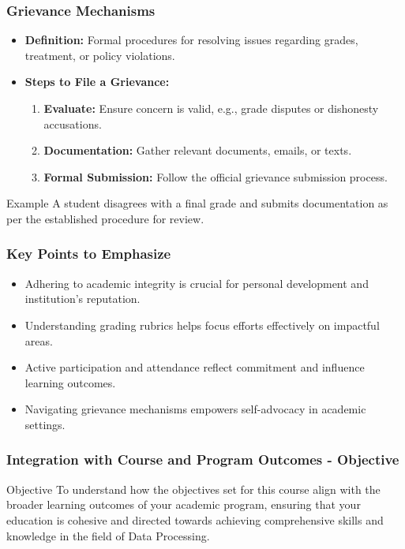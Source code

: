 \documentclass[aspectratio=169]{beamer}
\begin{document}
\begin{frame}[fragile]
    \frametitle{Grievance Mechanisms}
    \begin{itemize}
        \item \textbf{Definition:} Formal procedures for resolving issues regarding grades, treatment, or policy violations.
        \item \textbf{Steps to File a Grievance:}
        \begin{enumerate}
            \item \textbf{Evaluate:} Ensure concern is valid, e.g., grade disputes or dishonesty accusations.
            \item \textbf{Documentation:} Gather relevant documents, emails, or texts.
            \item \textbf{Formal Submission:} Follow the official grievance submission process.
        \end{enumerate}
    \end{itemize}
    \begin{block}{Example}
        A student disagrees with a final grade and submits documentation as per the established procedure for review.
    \end{block}
\end{frame}

\begin{frame}[fragile]
    \frametitle{Key Points to Emphasize}
    \begin{itemize}
        \item Adhering to academic integrity is crucial for personal development and institution's reputation.
        \item Understanding grading rubrics helps focus efforts effectively on impactful areas.
        \item Active participation and attendance reflect commitment and influence learning outcomes.
        \item Navigating grievance mechanisms empowers self-advocacy in academic settings.
    \end{itemize}
\end{frame}

\begin{frame}[fragile]
    \frametitle{Integration with Course and Program Outcomes - Objective}
    \begin{block}{Objective}
        To understand how the objectives set for this course align with the broader learning outcomes of your academic program, ensuring that your education is cohesive and directed towards achieving comprehensive skills and knowledge in the field of Data Processing.
    \end{block}
\end{frame}
\end{document}
